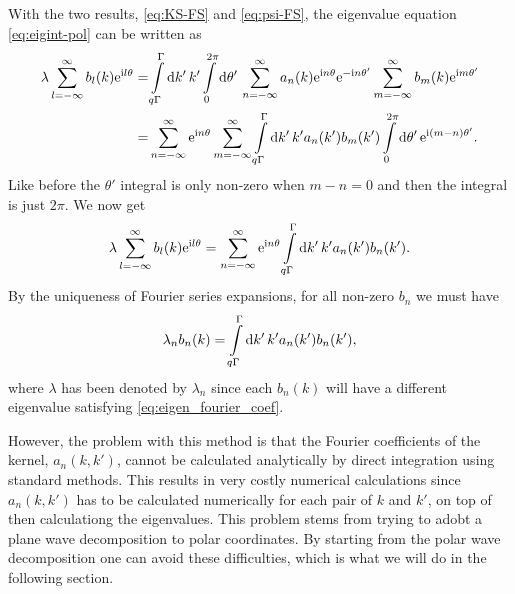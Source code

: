 \documentclass[11pt,a4paper, 
swedish,english %
]{article}
\begin{document}
With the two results, \eqref{eq:KS-FS} and \eqref{eq:psi-FS}, the
eigenvalue equation \eqref{eq:eigint-pol} can be written as
\begin{equation}
\begin{aligned}
\lambda\sum_{l=-\infty}^\infty b_l(k)\ee^{\ii l\theta}
=& \int_{q\Gamma}^\Gamma\rd{k'}\,k'\int_{0}^{2\pi}\rd\theta'\,
\sum_{n=-\infty}^\infty a_n(k)\ee^{\ii n\theta}\ee^{-\ii n\theta'}
\sum_{m=-\infty}^\infty b_m(k)\ee^{\ii m\theta'}\\
=& \sum_{n=-\infty}^\infty \ee^{\ii n\theta} \sum_{m=-\infty}^\infty 
\int_{q\Gamma}^\Gamma\rd{k'}\,k' a_n(k') b_m(k')
\int_{0}^{2\pi}\rd\theta'\,
\ee^{\ii (m-n)\theta'}.
\end{aligned}
\end{equation}
Like before the $\theta'$ integral is only non-zero when $m-n=0$ and
then the integral is just $2\pi$. We now get
\begin{equation}
\lambda\sum_{l=-\infty}^\infty b_l(k)\ee^{\ii l\theta}
= \sum_{n=-\infty}^\infty \ee^{\ii n\theta} 
\int_{q\Gamma}^\Gamma\rd{k'}\,k' a_n(k') b_n(k').
\end{equation}
By the uniqueness of Fourier series expansions, for all non-zero $b_n$ we must have
\begin{equation}
\label{eq:eigen_fourier_coef}
\lambda_n b_n(k) = \int_{q\Gamma}^\Gamma\rd{k'}\,k' a_n(k') b_n(k'),
\end{equation}
where $\lambda$ has been denoted by $\lambda_n$ since each $b_n(k)$ will have a different eigenvalue satisfying \eqref{eq:eigen_fourier_coef}. 

However, the problem with this method is that the Fourier coefficients of the kernel, $a_n(k, k')$, cannot be calculated analytically by direct integration using standard methods. This
results in very costly numerical calculations since $a_n(k, k')$
has to be calculated numerically for each pair of $k$ and $k'$, on 
top of then calculationg the eigenvalues.
%
This problem stems from trying to adobt a plane wave decomposition to polar coordinates. By starting from the polar wave decomposition one can avoid these difficulties, which is what we will do in the following section.
\end{document}

